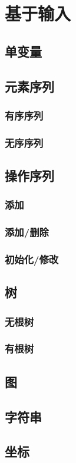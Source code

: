 \section{基于输入}
\subsection{单变量}
\subsection{元素序列}
\subsubsection{有序序列}
\subsubsection{无序序列}
\subsection{操作序列}
\subsubsection{添加}
\subsubsection{添加/删除}
\subsubsection{初始化/修改}
\subsection{树}
\subsubsection{无根树}
\subsubsection{有根树}
\subsection{图}
\subsection{字符串}
\subsection{坐标}
